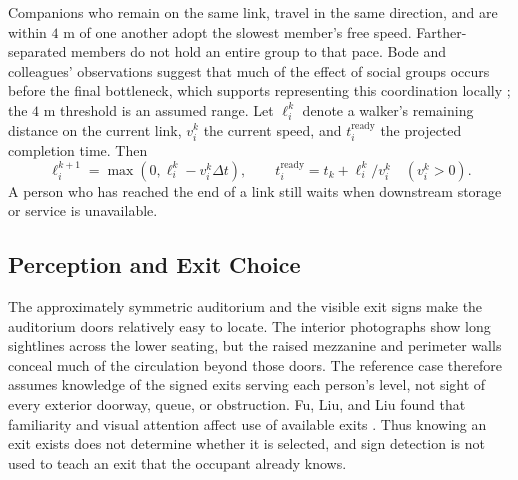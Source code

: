 \documentclass[11pt,a4paper]{article}
\begin{document}
Companions who remain on the same link, travel in the same direction, and are within $4$ m of one another adopt the slowest member's free speed. Farther-separated members do not hold an entire group to that pace. Bode and colleagues' observations suggest that much of the effect of social groups occurs before the final bottleneck, which supports representing this coordination locally \cite{bode}; the $4$ m threshold is an assumed range. Let $\ell_i^k$ denote a walker's remaining distance on the current link, $v_i^k$ the current speed, and $t_i^{\mathrm{ready}}$ the projected completion time. Then
\begin{equation}\label{eq:remaining}
\ell_i^{k+1}=\max(0,\ell_i^k-v_i^k\Delta t),\qquad
t_i^{\mathrm{ready}}=t_k+\ell_i^k/v_i^k\quad(v_i^k>0).
\end{equation}
A person who has reached the end of a link still waits when downstream storage or service is unavailable. 

\subsection{Perception and Exit Choice}

The approximately symmetric auditorium and the visible exit signs make the auditorium doors relatively easy to locate. The interior photographs show long sightlines across the lower seating, but the raised mezzanine and perimeter walls conceal much of the circulation beyond those doors. The reference case therefore assumes knowledge of the signed exits serving each person's level, not sight of every exterior doorway, queue, or obstruction. Fu, Liu, and Liu found that familiarity and visual attention affect use of available exits \cite{fu2023,fu2024}. Thus knowing an exit exists does not determine whether it is selected, and sign detection is not used to teach an exit that the occupant already knows.
\end{document}
